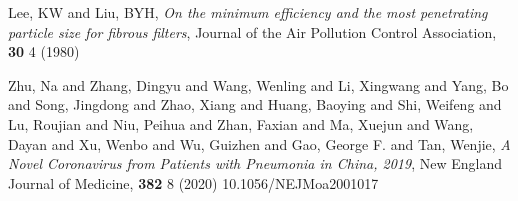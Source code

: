 \documentclass[10pt]{article} %
\begin{document}
\begin{thebibliography}{10}

  Lee, KW and Liu, BYH,
  \textit{On the minimum efficiency and the most penetrating particle size for fibrous filters},
  Journal of the Air Pollution Control Association,
  \textbf{30}
  4
 (1980)


Zhu, Na and Zhang, Dingyu and Wang, Wenling and Li, Xingwang and Yang, Bo and Song, Jingdong and Zhao, Xiang and Huang, Baoying and Shi, Weifeng and Lu, Roujian and Niu, Peihua and Zhan, Faxian and Ma, Xuejun and Wang, Dayan and Xu, Wenbo and Wu, Guizhen and Gao, George F. and Tan, Wenjie,
\textit{A Novel Coronavirus from Patients with Pneumonia in China, 2019},
New England Journal of Medicine,
\textbf{382}
8 
(2020)
10.1056/NEJMoa2001017

\end{thebibliography}
\end{document}
